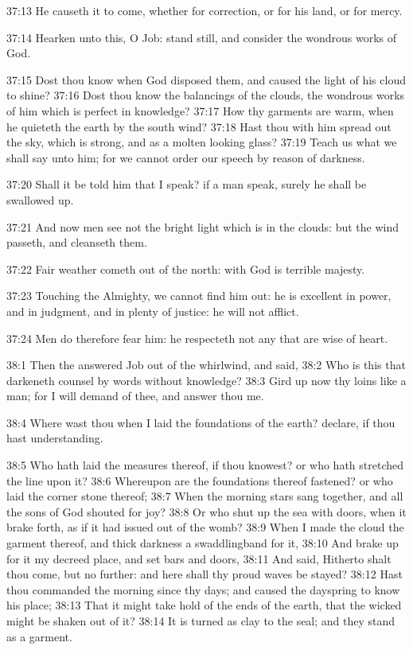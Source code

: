 37:13 He causeth it to come, whether for correction, or for his land, or for mercy.

37:14 Hearken unto this, O Job: stand still, and consider the wondrous works of God.

37:15 Dost thou know when God disposed them, and caused the light of his cloud to shine?  37:16 Dost thou know the balancings of the clouds, the wondrous works of him which is perfect in knowledge?  37:17 How thy garments are warm, when he quieteth the earth by the south wind?  37:18 Hast thou with him spread out the sky, which is strong, and as a molten looking glass?  37:19 Teach us what we shall say unto him; for we cannot order our speech by reason of darkness.

37:20 Shall it be told him that I speak? if a man speak, surely he shall be swallowed up.

37:21 And now men see not the bright light which is in the clouds: but the wind passeth, and cleanseth them.

37:22 Fair weather cometh out of the north: with God is terrible majesty.

37:23 Touching the Almighty, we cannot find him out: he is excellent in power, and in judgment, and in plenty of justice: he will not afflict.

37:24 Men do therefore fear him: he respecteth not any that are wise of heart.

38:1 Then the \LORD answered Job out of the whirlwind, and said, 38:2 Who is this that darkeneth counsel by words without knowledge?  38:3 Gird up now thy loins like a man; for I will demand of thee, and answer thou me.

38:4 Where wast thou when I laid the foundations of the earth?  declare, if thou hast understanding.

38:5 Who hath laid the measures thereof, if thou knowest? or who hath stretched the line upon it?  38:6 Whereupon are the foundations thereof fastened? or who laid the corner stone thereof; 38:7 When the morning stars sang together, and all the sons of God shouted for joy?  38:8 Or who shut up the sea with doors, when it brake forth, as if it had issued out of the womb?  38:9 When I made the cloud the garment thereof, and thick darkness a swaddlingband for it, 38:10 And brake up for it my decreed place, and set bars and doors, 38:11 And said, Hitherto shalt thou come, but no further: and here shall thy proud waves be stayed?  38:12 Hast thou commanded the morning since thy days; and caused the dayspring to know his place; 38:13 That it might take hold of the ends of the earth, that the wicked might be shaken out of it?  38:14 It is turned as clay to the seal; and they stand as a garment.

